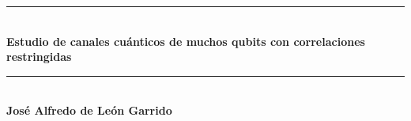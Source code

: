 \documentclass[11pt, spanish, letterpage]{article}
\date{}
\begin{document}
\begin{titlepage} %
        \newcommand{\HRule}{\rule{\linewidth}{0.5mm}} %

        \center %
        
			
        \HRule\\[0.6cm]

        {\huge\bfseries Estudio de canales cuánticos de muchos qubits con correlaciones restringidas}\\[0.5cm] %

        \HRule\\[2cm]
        


		\Large{\textbf{José Alfredo de León Garrido}}\\ [2cm] %



\end{titlepage}
\end{document}
